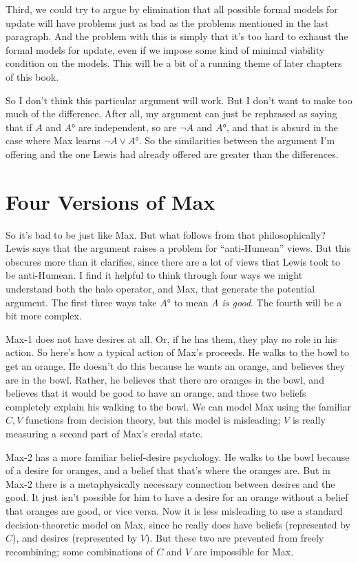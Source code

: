 \documentclass[11pt,]{book}
\begin{document}
Third, we could try to argue by elimination that all possible formal models for update will have problems just as bad as the problems mentioned in the last paragraph. And the problem with this is simply that it's too hard to exhaust the formal models for update, even if we impose some kind of minimal viability condition on the models. This will be a bit of a running theme of later chapters of this book.

So I don't think this particular argument will work. But I don't want to make too much of the difference. After all, my argument can just be rephrased as saying that if \(A\) and \(A°\) are independent, so are \(\neg A\) and \(A°\), and that is absurd in the case where Max learns \(\neg A \vee A°\). So the similarities between the argument I'm offering and the one Lewis had already offered are greater than the differences.

\hypertarget{four-versions-of-max}{%
\section{Four Versions of Max}\label{four-versions-of-max}}

So it's bad to be just like Max. But what follows from that philosophically? Lewis says that the argument raises a problem for ``anti-Humean'' views. But this obscures more than it clarifies, since there are a lot of views that Lewis took to be anti-Humean. I find it helpful to think through four ways we might understand both the halo operator, and Max, that generate the potential argument. The first three ways take \(A°\) to mean \emph{A is good}. The fourth will be a bit more complex.

Max-1 does not have desires at all. Or, if he has them, they play no role in his action. So here's how a typical action of Max's proceeds. He walks to the bowl to get an orange. He doesn't do this because he wants an orange, and believes they are in the bowl. Rather, he believes that there are oranges in the bowl, and believes that it would be good to have an orange, and those two beliefs completely explain his walking to the bowl. We can model Max using the familiar \(C, V\) functions from decision theory, but this model is misleading; \(V\) is really measuring a second part of Max's credal state.

Max-2 has a more familiar belief-desire psychology. He walks to the bowl because of a desire for oranges, and a belief that that's where the oranges are. But in Max-2 there is a metaphysically necessary connection between desires and the good. It just isn't possible for him to have a desire for an orange without a belief that oranges are good, or vice versa. Now it is less misleading to use a standard decision-theoretic model on Max, since he really does have beliefs (represented by \(C\)), and desires (represented by \(V\)). But these two are prevented from freely recombining; some combinations of \(C\) and \(V\) are impossible for Max.
\end{document}
